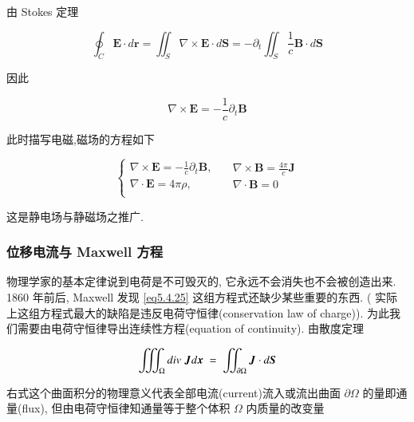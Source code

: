 \documentclass[11pt]{article}
\begin{document}
由 Stokes 定理

\begin{equation}
\oint_C {\boldsymbol{E} \cdot d\boldsymbol{r}}  = \iint_S {\nabla  \times \boldsymbol{E} \cdot d\boldsymbol{S}} =  - {\partial _t}\iint_S {\frac{1}{c}\boldsymbol{B} \cdot d\boldsymbol{S}}
\label{eq5.4.23}
\end{equation}

因此

\begin{equation}
\nabla  \times \boldsymbol{E} =  - \frac{1}{c}{\partial _t}\boldsymbol{B}
\label{eq5.4.24}
\end{equation}

此时描写电磁,磁场的方程如下

\begin{equation}
\left\{ {\begin{matrix}
	{\nabla  \times \boldsymbol{E} =  - \frac{1}{c}{\partial _t}\boldsymbol{B},}  \\ 
	{\nabla  \cdot \boldsymbol{E} = 4\pi \rho ,}  \\ 
	\end{matrix} } \right. \quad \begin{matrix}
{\nabla  \times \boldsymbol{B} = \frac{{4\pi }}{c}\boldsymbol{J}}  \\ 
{\nabla  \cdot \boldsymbol{B} = 0}  \\ 
\end{matrix} 
\label{eq5.4.25}
\end{equation}

这是静电场与静磁场之推广. 

\subsubsection{\kaishu 位移电流与 Maxwell 方程}

物理学家的基本定律说到电荷是不可毁灭的, 它永远不会消失也不会被创造出来. 1860 年前后, Maxwell 发现 \ref{eq5.4.25} 这组方程式还缺少某些重要的东西. ({\color{blue} 实际上这组方程式最大的缺陷是违反电荷守恒律(conservation law of charge)}). 为此我们需要由电荷守恒律导出连续性方程(equation of continuity). 由散度定理

\begin{equation}
\iiint_\Omega  {div\;\boldsymbol{J}d\boldsymbol{x}\; = \;\iint_{\partial \Omega } {\boldsymbol{J} \cdot d\boldsymbol{S}}}
\notag 
\end{equation}

右式这个曲面积分的物理意义代表全部电流(current)流入或流出曲面 $ {\partial \Omega } $ 的量即通量(flux), 但由电荷守恒律知通量等于整个体积 $ \Omega $ 内质量的改变量
\end{document}
